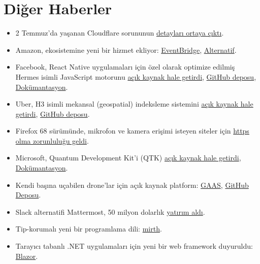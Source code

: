 \documentclass[11pt]{article}
\begin{document}
\section{Diğer Haberler}
\label{sec:org83c959a}
\begin{itemize}
\item 2 Temmuz'da yaşanan Cloudflare sorununun \href{https://blog.cloudflare.com/details-of-the-cloudflare-outage-on-july-2-2019/}{detayları ortaya çıktı}.
\item Amazon, ekosistemine yeni bir hizmet ekliyor: \href{https://aws.amazon.com/tr/blogs/aws/amazon-eventbridge-event-driven-aws-integration-for-your-saas-applications/}{EventBridge}, \href{https://www.trek10.com/blog/amazon-eventbridge/}{Alternatif}.
\item Facebook, React Native uygulamaları için özel olarak optimize edilmiş Hermes
isimli JavaScript motorunu \href{https://hermesengine.dev/}{açık kaynak hale getirdi}, \href{https://github.com/facebook/hermes}{GitHub deposu},
\href{https://facebook.github.io/react-native/docs/hermes/}{Dokümantasyon}.
\item Uber, H3 isimli mekansal (geospatial) indeksleme sistemini \href{https://eng.uber.com/visualizing-city-cores-with-h3/}{açık kaynak hale
getirdi}, \href{https://github.com/uber/h3}{GitHub deposu}.
\item Firefox 68 sürümünde, mikrofon ve kamera erişimi isteyen siteler için \href{https://blog.mozilla.org/webrtc/camera-microphone-require-https-in-firefox-68/}{https
olma zorunluluğu geldi}.
\item Microsoft, Quantum Development Kit'i (QTK) \href{https://cloudblogs.microsoft.com/quantum/2019/07/11/microsoft-quantum-oss-available-github/}{açık kaynak hale getirdi},
\href{https://docs.microsoft.com/tr-tr/quantum/install-guide}{Dokümantasyon}.
\item Kendi başına uçabilen drone'lar için açık kaynak platform: \href{https://www.gaas.dev/}{GAAS}, \href{https://github.com/generalized-intelligence/GAAS}{GitHub
Deposu}.
\item Slack alternatifi Mattermost, 50 milyon dolarlık \href{https://venturebeat.com/2019/06/19/mattermost-raises-50-million-to-advance-its-open-source-slack-alternative/}{yatırım aldı}.
\item Tip-korumalı yeni bir programlama dili: \href{https://github.com/mirth-lang/mirth}{mirth}.
\item Tarayıcı tabanlı .NET uygulamaları için yeni bir web framework duyuruldu:
\href{https://www.youtube.com/watch?v=uW-Kk7Qpv5U}{Blazor}.

\end{itemize}
\end{document}
